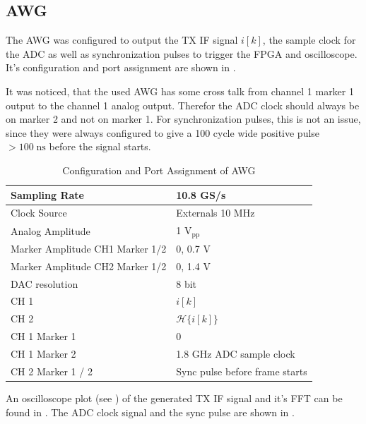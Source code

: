\subsection{\gls{AWG}}
The \gls{AWG} was configured to output the \gls{TX} \gls{IF} signal $i[k]$,
the sample clock for the \gls{ADC} as well as synchronization pulses to trigger
the \gls{FPGA} and oscilloscope. It's configuration and port assignment
are shown in .

It was noticed, that the used \gls{AWG} has some cross talk from
channel 1 marker 1 output to the channel 1 analog output. Therefor the
\gls{ADC} clock should always be on marker 2 and not on marker 1.
For synchronization pulses, this is not an issue, since they were always
configured to give a 100 cycle wide positive pulse $> 100 \; \text{ns}$ before
the signal starts. \\

\begin{table}[h]
  \centering
  \begin{tabular}{|l|l|}
    \hline
    Sampling Rate & 10.8 GS/s \\ \hline
    Clock Source & Externals 10 MHz \\ \hline
    Analog Amplitude & 1 $\text{V}_{\text{pp}}$ \\ \hline
    Marker Amplitude CH1 Marker 1/2 & 0, 0.7 V \\ \hline
    Marker Amplitude CH2 Marker 1/2 & 0, 1.4 V \\ \hline
    \gls{DAC} resolution & 8 bit \\ \hline
    CH 1 & $i[k]$ \\ \hline
    CH 2 & $\mathcal{H}\{i[k]\}$ \\ \hline
    CH 1 Marker 1 & 0 \\ \hline
    CH 1 Marker 2 & 1.8 GHz \gls{ADC} sample clock \\ \hline
    CH 2 Marker 1 / 2 & Sync pulse before frame starts \\ \hline
  \end{tabular}
  \caption{Configuration and Port Assignment of \gls{AWG}}
  \label{tab:res_450_awg}
\end{table}

An oscilloscope plot (see ) of the generated
\gls{TX} \gls{IF} signal and it's \gls{FFT} can be found in
.
The \gls{ADC} clock signal and the sync pulse are shown
in . \\

